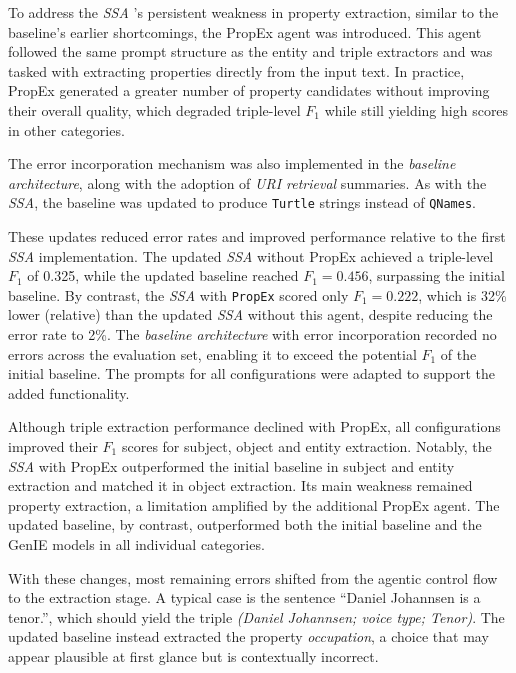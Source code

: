 \documentclass[a4paper,oneside,bibliography=totoc]{scrbook}
\begin{document}
To address the \textit{\ac{SSA}} 's persistent weakness in property extraction, similar to the baseline's earlier shortcomings, the \ac{PropEx} agent was introduced. This agent followed the same prompt structure as the entity and triple extractors and was tasked with extracting properties directly from the input text. In practice, \ac{PropEx} generated a greater number of property candidates without improving their overall quality, which degraded triple-level $F_{1}$ while still yielding high scores in other categories.

The error incorporation mechanism was also implemented in the \textit{baseline architecture}, along with the adoption of \textit{\ac{URI} retrieval} summaries. As with the \textit{\ac{SSA}}, the baseline was updated to produce \texttt{Turtle} strings instead of \texttt{QNames}.

These updates reduced error rates and improved performance relative to the first \textit{\ac{SSA}} implementation. The updated \textit{\ac{SSA}} without \ac{PropEx} achieved a triple-level $F_{1}$ of 0.325, while the updated baseline reached $F_{1}=0.456$, surpassing the initial baseline. By contrast, the \textit{\ac{SSA}} with \texttt{PropEx} scored only $F_{1}=0.222$, which is 32\% lower (relative) than the updated \textit{\ac{SSA}} without this agent, despite reducing the error rate to 2\%. The \textit{baseline architecture} with error incorporation recorded no errors across the evaluation set, enabling it to exceed the potential $F_{1}$ of the initial baseline. The prompts for all configurations were adapted to support the added functionality.

Although triple extraction performance declined with \ac{PropEx}, all configurations improved their $F_{1}$ scores for subject, object and entity extraction. Notably, the \textit{\ac{SSA}} with \ac{PropEx} outperformed the initial baseline in subject and entity extraction and matched it in object extraction. Its main weakness remained property extraction, a limitation amplified by the additional \ac{PropEx} agent. The updated baseline, by contrast, outperformed both the initial baseline and the GenIE models in all individual categories.

With these changes, most remaining errors shifted from the agentic control flow to the extraction stage. A typical case is the sentence \enquote{Daniel Johannsen is a tenor.}, which should yield the triple \textit{(Daniel Johannsen; voice type; Tenor)}. The updated baseline instead extracted the property \textit{occupation}, a choice that may appear plausible at first glance but is contextually incorrect.
\end{document}
